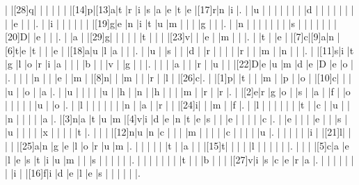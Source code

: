 \documentclass[12pt]{article}
\begin{document}
\begin{Puzzle}{22}{24}
  |{}  |[28]q|{}  |{}  |{}  |{}  |{}  |{}  |[14]p|[13]a|t   |r   |i   |s   |a   |e   |t   |e   |[17]r|n   |i   |.
  |{}  |u   |{}  |{}  |{}  |{}  |{}  |{}  |{}  |d   |{}  |{}  |{}  |{}  |{}  |{}  |{}  |{}  |e   |{}  |{}  |.
  |{}  |i   |{}  |{}  |{}  |{}  |{}  |{}  |[19]g|e   |n   |i   |t   |u   |m   |{}  |{}  |{}  |g   |{}  |{}  |.
  |{}  |n   |{}  |{}  |{}  |{}  |{}  |{}  |{}  |s   |{}  |{}  |{}  |{}  |{}  |{}  |[20]D|{}  |e   |{}  |{}  |.
  |{}  |a   |{}  |[29]g|{}  |{}  |{}  |{}  |{}  |t   |{}  |{}  |{}  |[23]v|{}  |{}  |e   |{}  |m   |{}  |{}  |.
  |{}  |t   |{}  |e   |{}  |[7]c|[9]a|n   |[6]t|e   |t   |{}  |{}  |e   |{}  |[18]a|u   |l   |a   |{}  |{}  |.
  |{}  |u   |{}  |s   |{}  |{}  |d   |{}  |r   |{}  |{}  |{}  |{}  |r   |{}  |{}  |m   |{}  |n   |{}  |{}  |.
  |{}  |[11]s|i   |t   |g   |l   |o   |r   |i   |a   |{}  |{}  |{}  |b   |{}  |{}  |v   |{}  |g   |{}  |{}  |.
  |{}  |{}  |{}  |a   |{}  |{}  |r   |{}  |u   |{}  |{}  |[22]D|e   |u   |m   |d   |e   |D   |e   |o   |{}  |.
  |{}  |{}  |{}  |n   |{}  |{}  |e   |{}  |m   |{}  |[8]n|{}  |{}  |m   |{}  |{}  |r   |{}  |l   |{}  |[26]c|.
  |{}  |[1]p|{}  |t   |{}  |{}  |m   |{}  |p   |{}  |o   |{}  |[10]c|{}  |{}  |{}  |u   |{}  |o   |{}  |a   |.
  |{}  |u   |{}  |{}  |{}  |{}  |u   |{}  |h   |{}  |n   |{}  |h   |{}  |{}  |{}  |m   |{}  |r   |{}  |r   |.
  |{}  |[2]e|r   |g   |o   |{}  |s   |{}  |a   |{}  |f   |{}  |o   |{}  |{}  |{}  |{}  |{}  |u   |{}  |o   |.
  |{}  |l   |{}  |{}  |{}  |{}  |{}  |{}  |n   |{}  |a   |{}  |r   |{}  |{}  |[24]i|{}  |{}  |m   |{}  |f   |.
  |{}  |l   |{}  |{}  |{}  |{}  |{}  |{}  |t   |{}  |c   |{}  |u   |{}  |{}  |n   |{}  |{}  |{}  |{}  |a   |.
  |[3]n|a   |t   |u   |m   |[4]v|i   |d   |e   |n   |t   |e   |s   |{}  |{}  |e   |{}  |{}  |{}  |{}  |c   |.
  |{}  |e   |{}  |{}  |{}  |e   |{}  |{}  |s   |{}  |u   |{}  |{}  |{}  |{}  |x   |{}  |{}  |{}  |{}  |t   |.
  |{}  |{}  |{}  |[12]n|u   |n   |c   |{}  |{}  |{}  |m   |{}  |{}  |{}  |{}  |c   |{}  |{}  |{}  |{}  |u   |.
  |{}  |{}  |{}  |{}  |{}  |i   |{}  |[21]l|{}  |{}  |{}  |{}  |[25]a|n   |g   |e   |l   |o   |r   |u   |m   |.
  |{}  |{}  |{}  |{}  |{}  |t   |{}  |a   |{}  |{}  |[15]t|{}  |{}  |{}  |{}  |l   |{}  |{}  |{}  |{}  |{}  |.
  |{}  |{}  |{}  |[5]c|a   |e   |l   |e   |s   |t   |i   |u   |m   |{}  |{}  |s   |{}  |{}  |{}  |{}  |{}  |.
  |{}  |{}  |{}  |{}  |{}  |{}  |{}  |t   |{}  |{}  |b   |{}  |{}  |{}  |[27]v|i   |s   |c   |e   |r   |a   |.
  |{}  |{}  |{}  |{}  |{}  |{}  |{}  |i   |{}  |[16]f|i   |d   |e   |l   |e   |s   |{}  |{}  |{}  |{}  |{}  |.
\end{Puzzle}
\end{document}
